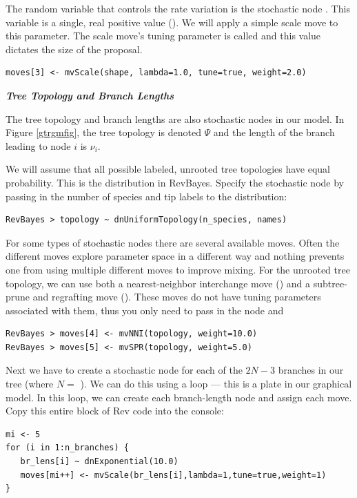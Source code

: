 The random variable that controls the rate variation is the stochastic node . This variable is a single, real positive value (). 
We will apply a simple scale move to this parameter.
The scale move's tuning parameter is called  and this value dictates the size of the proposal.
{\tt \begin{snugshade*}
\begin{lstlisting}
moves[3] <- mvScale(shape, lambda=1.0, tune=true, weight=2.0)\end{lstlisting}
\end{snugshade*}}


\textbf{\textit{Tree Topology and Branch Lengths}}

The tree topology and branch lengths are also stochastic nodes in our model. 
In Figure \ref{gtrgmfig}, the tree topology is denoted $\Psi$ and the length of the branch leading to node $i$ is $\nu_i$.

We will assume that all possible labeled, unrooted tree topologies have equal probability. This is the  distribution in RevBayes. Specify the  stochastic node by passing in the number of species  and tip labels  to the  distribution:
{\tt \begin{snugshade*}
\begin{lstlisting}
RevBayes > topology ~ dnUniformTopology(n_species, names)
\end{lstlisting}
\end{snugshade*}}

For some types of stochastic nodes there are several available moves. 
Often the different moves explore parameter space in a different way and nothing prevents one from using multiple different moves to improve mixing. 
For the unrooted tree topology, we can use both a nearest-neighbor interchange move () and a subtree-prune and regrafting move (). These moves do not have tuning parameters associated with them, thus you only need to pass in the  node and  
{\tt \begin{snugshade*}
\begin{lstlisting}
RevBayes > moves[4] <- mvNNI(topology, weight=10.0)
RevBayes > moves[5] <- mvSPR(topology, weight=5.0)
\end{lstlisting}
\end{snugshade*}}


Next we have to create a stochastic node for each of the $2N-3$ branches in our tree (where $N=$ ). 
We can do this using a  loop --- this is a plate in our graphical model. In this loop, we can create each branch-length node and assign each move. Copy this entire block of Rev code into the console:
{\tt \small \begin{snugshade*}
\begin{lstlisting}
mi <- 5
for (i in 1:n_branches) {
   br_lens[i] ~ dnExponential(10.0)
   moves[mi++] <- mvScale(br_lens[i],lambda=1,tune=true,weight=1) 
}
\end{lstlisting}
\end{snugshade*}}

